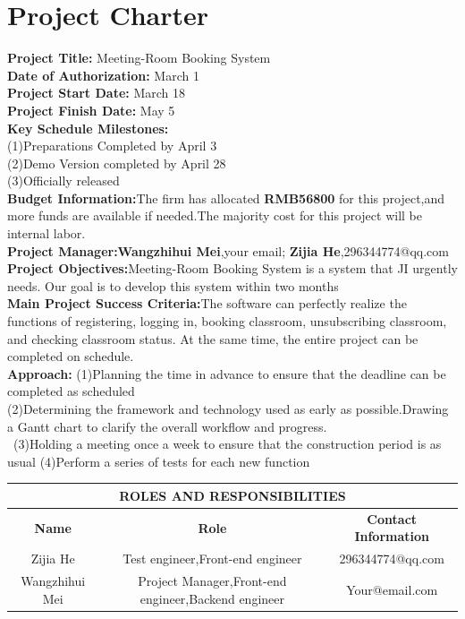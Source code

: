 \documentclass[runningheads]{llncs}
\begin{document}
\section{Project Charter}
\textbf{Project Title:} Meeting-Room Booking System\\
\textbf{Date of Authorization:} March 1\\
\textbf{Project Start Date:} March 18\\
\textbf{Project Finish Date:} May 5\\
\textbf{Key Schedule Milestones:}\\(1)Preparations Completed by April 3\\(2)Demo Version completed by April 28\\(3)Officially released\\
\textbf{Budget Information:}The firm has allocated \textbf{RMB56800} for this project,and more funds are available if needed.The majority cost for this project will be internal labor.\\
\textbf{Project Manager:}\textbf{Wangzhihui Mei},your email; \textbf{Zijia He},296344774@qq.com\\
\textbf{Project Objectives:}Meeting-Room Booking System is a system that JI urgently needs. Our goal is to develop this system within two months\\
\textbf{Main Project Success Criteria:}The software can perfectly realize the functions of registering, logging in, booking classroom, unsubscribing classroom, and checking classroom status. At the same time, the entire project can be completed on schedule.\\
\textbf{Approach:}
(1)Planning the time in advance to ensure that the deadline can be completed as scheduled\\
(2)Determining the framework and technology used as early as possible.Drawing a Gantt chart to clarify the overall workflow and progress.\\\
(3)Holding a meeting once a week to ensure that the construction period is as usual
(4)Perform a series of tests for each new function\\
\begin{table}
\centering
\begin{tabular}{|c|c|c|}
\hline
\multicolumn{3}{|c|}{\textbf{ROLES AND RESPONSIBILITIES}}\\ %
\hline
\textbf{Name}&\textbf{Role}&\textbf{Contact Information}\\
\hline
Zijia He&Test engineer,Front-end engineer& 296344774@qq.com\\
\hline
Wangzhihui Mei&Project Manager,Front-end engineer,Backend engineer&Your@email.com\\
\hline
\end{tabular}
\end{table}
\end{document}
